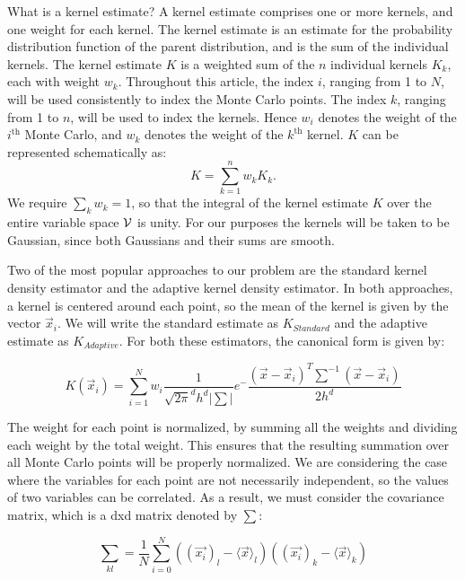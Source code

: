 \documentclass[prd,twocolumn]{revtex4}
\def\nMC{N}
\newcommand {\abs}[1]{\left| #1 \right|}
\begin{document}
What is a kernel estimate?  A kernel estimate comprises one or more kernels, and one weight for each kernel.  The kernel estimate is an estimate for the probability distribution function of the parent distribution, and is the sum of the individual kernels.  The kernel estimate $K$ is a weighted sum of the $n$ individual kernels $K_k$, each with weight $w_k$.  Throughout this article, the index $i$, ranging from 1 to $\nMC$, will be used consistently to index the Monte Carlo points.  The index $k$, ranging from 1 to $n$, will be used to index the kernels.  Hence $w_i$ denotes the weight of the $i^{\text{th}}$ Monte Carlo, and $w_k$ denotes the weight of the $k^{\text{th}}$ kernel.  $K$ can be represented schematically as:
\begin{equation}
K = \sum_{k=1}^{n}{w_k K_k}.
\end{equation}
We require $\sum_k{w_k}=1$, so that the integral of the kernel estimate $K$ over the entire variable space ${\cal V}$ is unity.  For our purposes the kernels will be taken to be Gaussian, since both Gaussians and their sums are smooth.

Two of the most popular approaches to our problem are the standard kernel density estimator and the adaptive kernel density estimator.  In both approaches, a kernel is centered around each point, so the mean of the kernel is given by the vector $\vec{x}_i$.  We will write the standard estimate as $K_{Standard}$ and the adaptive estimate as $K_{Adaptive}$.  For both these estimators, the canonical form is given by:

\begin{equation}
\label{eqn:CanonicalFormofKDE}
K(\vec{x}_i) = \sum_{i=1}^N w_i \frac {1}{\sqrt{2\pi}^d h^d \abs{\sum}} e^-{\frac {(\vec{x} - \vec{x}_i)^T {\sum}^{-1} (\vec{x} - \vec{x}_i)} {2h^d}}
\end{equation}

The weight for each point is normalized, by summing all the weights and dividing each weight by the total weight.  This ensures that the resulting summation over all Monte Carlo points will be properly normalized.   We are considering the case where the variables for each point are not necessarily independent, so the values of two variables can be correlated. As a result, we must consider the covariance matrix, which is a dxd matrix denoted by $\sum$:

\begin{equation}
\label{eqn:CovarianceMatrix}
\sum_{kl} = \frac {1}{N} \sum_{i=0}^N((\vec{x_i})_l - \langle \vec{x} \rangle_l) ((\vec{x_i})_k - \langle \vec{x} \rangle_k) 
\end{equation}
\end{document}
